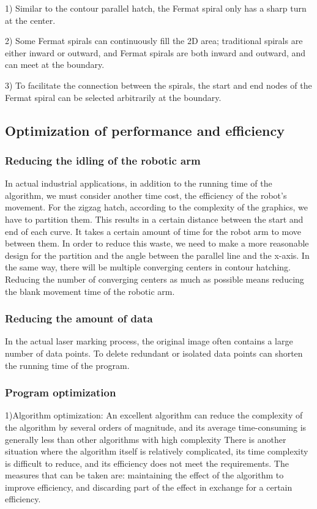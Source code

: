 \documentclass{apmcmthesis}
\begin{document}
1) Similar to the contour parallel hatch, the Fermat spiral only has a sharp turn at the center.


2) Some Fermat spirals can continuously fill the 2D area; traditional spirals are either inward or outward, and Fermat spirals are both inward and outward, and can meet at the boundary.


3) To facilitate the connection between the spirals, the start and end nodes of the Fermat spiral can be selected arbitrarily at the boundary.
\subsection{Optimization of performance and efficiency}
\subsubsection{Reducing the idling of the robotic arm}
In actual industrial applications, in addition to the running time of the algorithm, we must consider another time cost, the efficiency of the robot's movement. For the zigzag hatch, according to the complexity of the graphics, we have to partition them. This results in a certain distance between the start and end of each curve. It takes a certain amount of time for the robot arm to move between them. In order to reduce this waste, we need to make a more reasonable design for the partition and the angle between the parallel line and the x-axis. In the same way, there will be multiple converging centers in contour hatching. Reducing the number of converging centers as much as possible means reducing the blank movement time of the robotic arm.

\subsubsection{Reducing the amount of data}
In the actual laser marking process, the original image often contains a large number of data points. To delete redundant or isolated data points can shorten the running time of the program.
\subsubsection{Program optimization}
1)Algorithm optimization:
An excellent algorithm can reduce the complexity of the algorithm by several orders of magnitude, and its average time-consuming is generally less than other algorithms with high complexity
There is another situation where the algorithm itself is relatively complicated, its time complexity is difficult to reduce, and its efficiency does not meet the requirements. The measures that can be taken are: maintaining the effect of the algorithm to improve efficiency, and discarding part of the effect in exchange for a certain efficiency.
\end{document}
